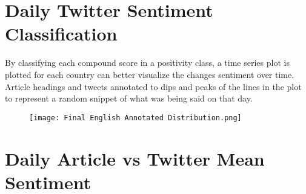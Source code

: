 \section{Daily Twitter Sentiment Classification}

By classifying each compound score in a positivity class, a time series plot is plotted for each country can better visualize the changes sentiment over time.
Article headings and tweets annotated to dips and peaks of the lines in the plot to represent a random snippet of what was being said on that day.

\begin{figure}[h!]
\texttt{[image: Final English Annotated Distribution.png]}
\caption[English Annotated Sentiment Distribution]{ }
\label{fig:English}
\end{figure}

\newpage
%
%
%
%
%
%
%
%
%
%

\section{Daily Article vs Twitter Mean Sentiment}

